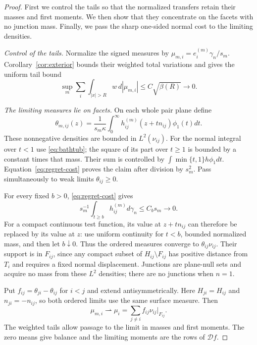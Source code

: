 \documentclass[11pt,reqno]{amsart}
\newcommand{\ga}{\gamma}
\newcommand{\DD}{\mathcal D}
\begin{document}
\begin{proof}
First we control the tails so that the normalized transfers retain
their masses and first moments. We then show that they concentrate
on the facets with no junction mass. Finally, we pass the sharp
one-sided normal cost to the limiting densities.

\smallskip\noindent\emph{Control of the tails.}
Normalize the signed measures by $\mu_{m,i}=e_i^{(m)}\ga_n/s_m$.
Corollary~\ref{cor:exterior} bounds their weighted total variations and
gives the uniform tail bound
\begin{equation}\label{eq:normalized-tightness}
 \sup_m\sum_i\int_{|x|>R}w\,d|\mu_{m,i}|
       \le C\sqrt{\beta(R)}\longrightarrow0.
\end{equation}

\smallskip\noindent\emph{The limiting measures lie on facets.}
On each whole pair plane define
\begin{equation}\label{eq:theta}
 \theta_{m,ij}(z)=\frac1{s_m\kappa}
                  \int_0^\infty h_{ij}^{(m)}(z+tn_{ij})\phi_1(t)dt.
\end{equation}
These nonnegative densities are bounded in $L^2(\nu_{ij})$.
For the normal integral over $t<1$ use \eqref{eq:bathtub}; the square
of its part over $t\ge1$ is bounded by a constant times that mass.
Their sum is controlled by $\int\min\{t,1\}h\phi_1dt$.
Equation~\eqref{eq:regret-cost} proves the claim after division by
$s_m^2$. Pass simultaneously to weak limits $\theta_{ij}\ge0$.

For every fixed $b>0$, \eqref{eq:regret-cost} gives
\begin{equation}\label{eq:far-normal}
 s_m^{-1}\int_{t\ge b}h_{ij}^{(m)}d\ga_n\le C_bs_m\to0.
\end{equation}
For a compact continuous test function, its value at $z+tn_{ij}$ can
therefore be replaced by its value at $z$: use uniform continuity for
$t<b$, bounded normalized mass, and then let $b\downarrow0$.
Thus the ordered measures converge to $\theta_{ij}\nu_{ij}$.
Their support is in $F_{ij}$, since any compact subset of
$H_{ij}\setminus F_{ij}$ has positive distance from $T_i$ and requires
a fixed normal displacement. Junctions are plane-null sets and acquire
no mass from these $L^2$ densities; there are no junctions when $n=1$.

Put $f_{ij}=\theta_{ji}-\theta_{ij}$ for $i<j$ and extend
antisymmetrically. Here $H_{ji}=H_{ij}$ and $n_{ji}=-n_{ij}$, so both
ordered limits use the same surface measure. Then
\begin{equation}\label{eq:measure-limit}
 \mu_{m,i}\rightharpoonup\mu_i
       =\sum_{j\ne i}f_{ij}\nu_{ij}|_{F_{ij}}.
\end{equation}
The weighted tails allow passage to the limit in masses and first moments.
The zero means give balance and the limiting moments are the rows of $\DD f$.


\end{proof}
\end{document}
